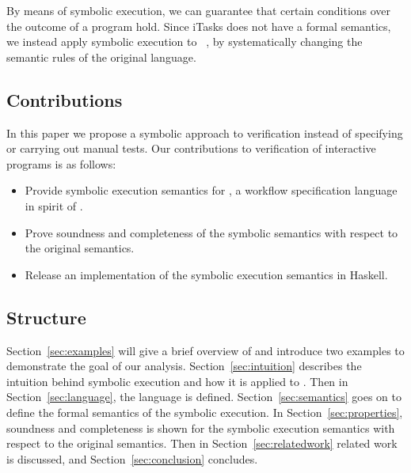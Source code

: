 By means of symbolic execution, we can guarantee that certain conditions over the outcome of a \TOP program hold.
Since iTasks does not have a formal semantics, we instead apply symbolic execution to \TOPHAT~\cite{Steenvoorden2019},
by systematically changing the semantic rules of the original language.



\subsection{Contributions}

In this paper we propose a symbolic approach to verification instead of specifying or carrying out manual tests.
Our contributions to verification of interactive programs is as follows:

\begin{itemize}
  \item Provide symbolic execution semantics for \TOPHAT, a workflow specification language in spirit of \TOP.
  \item Prove soundness and completeness of the symbolic semantics with respect to the original \TOPHAT semantics.
  \item Release an implementation of the symbolic execution semantics in Haskell.
\end{itemize}



\subsection{Structure}

Section~\ref{sec:examples} will give a brief overview of \TOPHAT and introduce two examples to demonstrate the goal of our analysis.
Section~\ref{sec:intuition} describes the intuition behind symbolic execution and how it is applied to \TOPHAT.
Then in Section~\ref{sec:language}, the \TOPHAT language is defined.
Section~\ref{sec:semantics} goes on to define the formal semantics of the symbolic execution.
In Section~\ref{sec:properties}, soundness and completeness is shown for the symbolic execution semantics with respect to the original \TOPHAT semantics.
Then in Section~\ref{sec:relatedwork} related work is discussed, and Section~\ref{sec:conclusion} concludes.
